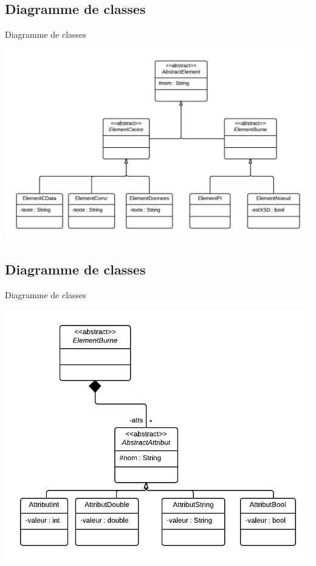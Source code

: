 \documentclass[aspectratio=169]{beamer}
\begin{document}
\subsection{Diagramme de classes}
\begin{frame}{Diagramme de classes}
\begin{center}
  \includegraphics[scale=0.3]{ddc_abs_elmt}
\end{center}
\end{frame}

\subsection{Diagramme de classes}
\begin{frame}{Diagramme de classes}
\begin{center}
  \includegraphics[scale=0.3]{ddc_elmt_burne}
\end{center}
\end{frame}
\end{document}
